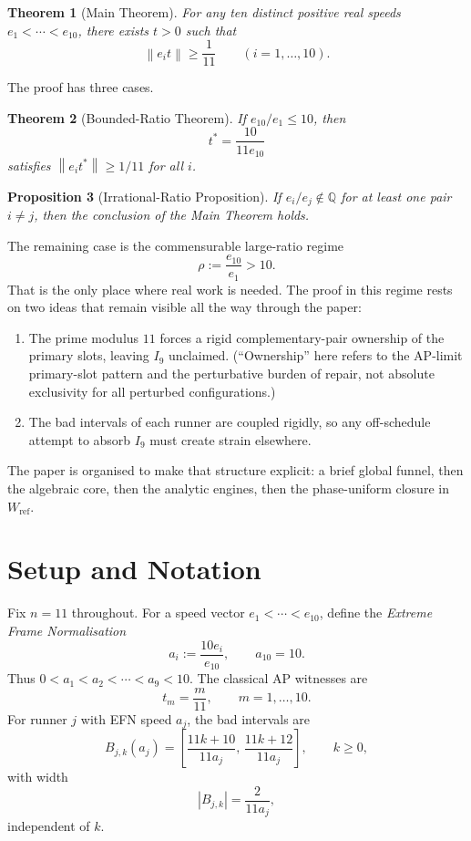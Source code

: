 \documentclass[12pt,a4paper]{amsart}
\newtheorem{theorem}{Theorem}[section]
\newtheorem{proposition}[theorem]{Proposition}
\theoremstyle{definition}
\theoremstyle{remark}
\newcommand{\Wref}{W_{\mathrm{ref}}}
\newcommand{\norm}[1]{\left\|#1\right\|}
\begin{document}
\begin{theorem}[Main Theorem]
For any ten distinct positive real speeds $e_1<\cdots<e_{10}$, there exists $t>0$ such that
\[
  \norm{e_i t}\ge \frac{1}{11}\qquad(i=1,\ldots,10).
\]
\end{theorem}

The proof has three cases.

\begin{theorem}[Bounded-Ratio Theorem]
If $e_{10}/e_1\le 10$, then
\[
  t^*=\frac{10}{11e_{10}}
\]
satisfies $\norm{e_i t^*}\ge 1/11$ for all $i$.
\end{theorem}

\begin{proposition}[Irrational-Ratio Proposition]
If $e_i/e_j\notin\mathbb{Q}$ for at least one pair $i\ne j$, then the conclusion of the
Main Theorem holds.
\end{proposition}

The remaining case is the commensurable large-ratio regime
\[
  \rho := \frac{e_{10}}{e_1} > 10.
\]
That is the only place where real work is needed. The proof in this regime rests on two ideas
that remain visible all the way through the paper:
\begin{enumerate}
  \item The prime modulus $11$ forces a rigid complementary-pair ownership of the primary
        slots, leaving $I_9$ unclaimed. (``Ownership'' here refers to the AP-limit primary-slot
        pattern and the perturbative burden of repair, not absolute exclusivity for all perturbed
        configurations.)
  \item The bad intervals of each runner are coupled rigidly, so any off-schedule attempt to
        absorb $I_9$ must create strain elsewhere.
\end{enumerate}

The paper is organised to make that structure explicit: a brief global funnel, then the
algebraic core, then the analytic engines, then the phase-uniform closure in $\Wref$.

\section{Setup and Notation}

Fix $n=11$ throughout. For a speed vector $e_1<\cdots<e_{10}$, define the
\emph{Extreme Frame Normalisation}
\[
  a_i := \frac{10e_i}{e_{10}},\qquad a_{10}=10.
\]
Thus $0<a_1<a_2<\cdots<a_9<10$. The classical AP witnesses are
\[
  t_m = \frac{m}{11},\qquad m=1,\ldots,10.
\]
For runner $j$ with EFN speed $a_j$, the bad intervals are
\[
  B_{j,k}(a_j) = \left[\frac{11k+10}{11a_j},\,\frac{11k+12}{11a_j}\right],\qquad k\ge 0,
\]
with width
\[
  |B_{j,k}| = \frac{2}{11a_j},
\]
independent of $k$.
\end{document}
